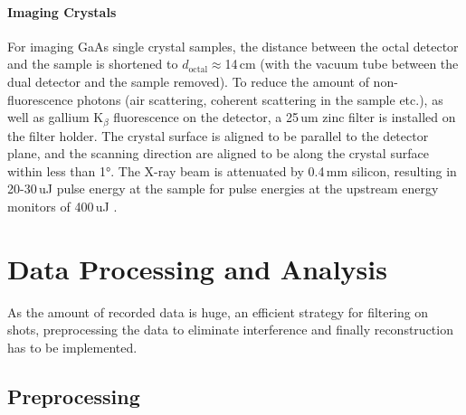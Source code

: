 \paragraph{Imaging Crystals}
For imaging GaAs single crystal samples, the distance between the octal detector and the sample is shortened to $d_\text{octal}\approx$14\,cm (with the vacuum tube between the dual detector and the sample removed). To reduce the amount of non-fluorescence photons  (air scattering, coherent scattering in the sample etc.), as well as gallium K$_\beta$ fluorescence on the detector, a 25\,um zinc filter is installed on the filter holder. The crystal surface is aligned to be parallel to the detector plane, and the scanning direction are aligned to be along the crystal surface within less than 1°. The X-ray beam is attenuated by 0.4\,mm silicon, resulting in 20-30\,uJ pulse energy at the sample for pulse energies at the upstream energy monitors of 400\,uJ \cite{yabashi2015,tono2013}.

\section{Data Processing and Analysis}
As the amount of recorded data is huge, an efficient strategy for filtering on shots, preprocessing the data to eliminate interference and finally reconstruction has to be implemented.
\subsection{Preprocessing}









